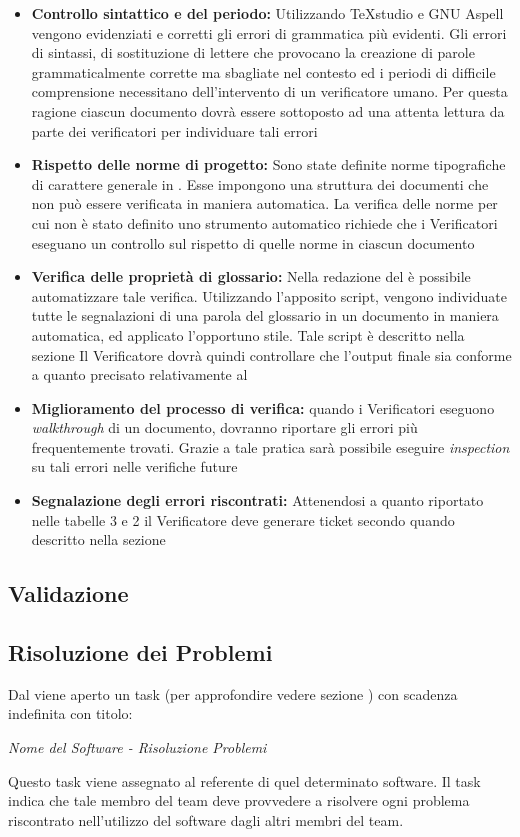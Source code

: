 \documentclass[12pt,a4paper]{article}
\begin{document}
\begin{itemize}
	\item \textbf{Controllo sintattico e del periodo:} Utilizzando TeXstudio e GNU Aspell vengono evidenziati e corretti gli errori di grammatica più evidenti. Gli errori di sintassi, di sostituzione di lettere che provocano la creazione di parole grammaticalmente corrette ma sbagliate nel contesto ed i periodi di difficile comprensione necessitano dell'intervento di un verificatore umano. Per questa ragione ciascun documento dovrà essere sottoposto ad una attenta lettura da parte dei verificatori per individuare tali errori
	\item \textbf{Rispetto delle norme di progetto:} Sono state definite norme tipografiche di carattere generale in \NdP. Esse impongono una struttura dei documenti che non può essere verificata in maniera automatica. La verifica delle norme per cui non è stato definito uno strumento automatico richiede che i Verificatori eseguano un controllo sul rispetto di quelle norme in ciascun documento
	\item \textbf{Verifica delle proprietà di glossario:} Nella redazione del \GlO{} è possibile automatizzare tale verifica. Utilizzando l'apposito script, vengono individuate tutte le segnalazioni di una parola del glossario in un documento in maniera automatica, ed applicato l'opportuno stile. Tale script è descritto nella sezione \TODO{} Il Verificatore dovrà quindi controllare che l'output finale sia conforme a quanto precisato relativamente al \GlO
	\item \textbf{Miglioramento del processo di verifica:} quando i Verificatori eseguono \emph{walkthrough} di un documento, dovranno riportare gli errori più frequentemente trovati. Grazie a tale pratica sarà possibile eseguire \emph{inspection} su tali errori nelle verifiche future
	\item \textbf{Segnalazione degli errori riscontrati:} Attenendosi a quanto riportato nelle tabelle 3 e 2 il Verificatore deve generare ticket secondo quando descritto nella sezione \TODO{}
\end{itemize}


\subsection{Validazione} %

\subsection{Risoluzione dei Problemi}\label{Risoluzione dei Problemi} %
Dal \PM{} viene aperto un task (per approfondire vedere sezione \TODO) con scadenza indefinita con titolo:
\begin{center}
\emph{Nome del Software - Risoluzione Problemi}
\end{center}
Questo task viene assegnato al referente di quel determinato software. Il task indica che tale membro del team deve provvedere a risolvere ogni problema riscontrato nell'utilizzo del software dagli altri membri del team.
\newpage
\end{document}
